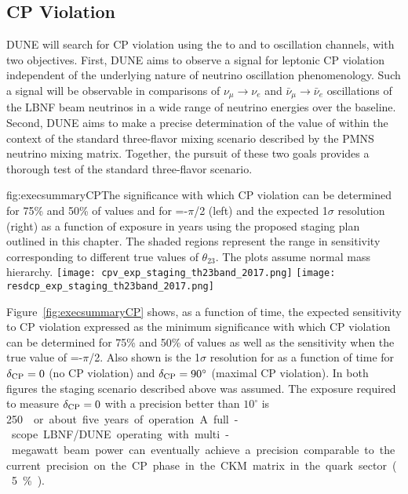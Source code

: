 \subsection{CP Violation}

DUNE will search for CP violation using the \numu to \nue and \anumu
to \anue oscillation channels, with two objectives.  First, DUNE aims
to observe a signal for leptonic CP violation independent of the
underlying nature of neutrino oscillation phenomenology. Such a signal
will be observable in comparisons of $\nu_\mu \rightarrow \nu_e$ and
$\bar{\nu}_{\mu} \rightarrow \bar{\nu}_e$ oscillations of the LBNF
beam neutrinos in a wide range of neutrino energies over the
 baseline.
Second,
DUNE aims to make a precise determination of the value of \deltacp
within the context of the standard three-flavor mixing scenario
described by the PMNS neutrino mixing matrix. Together, the pursuit of
these two goals provides a thorough test of the standard three-flavor
scenario.

\begin{dunefigure}{fig:execsummaryCP}{The
    significance with which CP violation can be determined for 75\% and 50\% of
    \deltacp values and for \deltacp=-$\pi$/2 (left) and the expected 1$\sigma$ resolution
    (right) as a function of exposure in years using the proposed
    staging plan outlined in this chapter. The shaded regions
    represent the range in sensitivity corresponding to
    different true values of $\theta_{23}$. The plots assume normal mass hierarchy.}
\texttt{[image: cpv\_exp\_staging\_th23band\_2017.png]}
 \texttt{[image: resdcp\_exp\_staging\_th23band\_2017.png]}
\end{dunefigure}
%
Figure~\ref{fig:execsummaryCP} shows, as a function of time, the
expected sensitivity to CP violation expressed as the minimum significance
with which CP violation can be determined for 75\% and 50\% of
\deltacp values as well as the sensitivity when the true value of \deltacp=-$\pi$/2.
Also shown is the 1$\sigma$ resolution for \deltacp as a
function of time for $\delta_{\rm CP}=0$ (no CP violation) and
$\delta_{\rm CP}=90^\circ$ (maximal CP violation). In both figures the staging scenario
described above was assumed.  The exposure required to measure
$\delta_{\rm CP} = 0 $ with a precision better than $10^\circ$ is \SI{250}~\ktMWyr{} or about five years of operation. A full-scope LBNF/DUNE operating with 
multi-megawatt 
beam power can eventually achieve a precision 
comparable to the current precision on the CP phase in the
CKM matrix in the quark sector (5\%).

